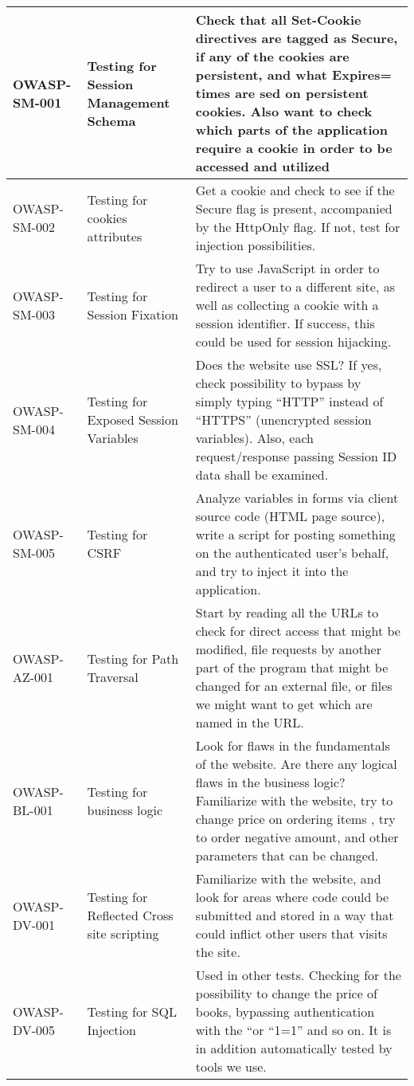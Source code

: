 \begin{longtable}{| l | p{4.5cm} | p{7.5cm} |}
	OWASP-SM-001 & Testing for Session Management Schema
&  
Check that all Set-Cookie directives are tagged as Secure, if any of the cookies are persistent, and what Expires= times are sed on persistent cookies. Also want to check which parts of the application require a cookie in order to be accessed and utilized
\\ \hline

	OWASP-SM-002 & Testing for cookies attributes
 & 
Get a cookie and check to see if the Secure flag is present, accompanied by the HttpOnly flag. If not, test for injection possibilities.
\\ \hline

	OWASP-SM-003 & Testing for Session Fixation
 &  
Try to use JavaScript in order to redirect a user to a different site, as well as collecting a cookie with a session identifier. If success, this could be used for session hijacking.
\\ \hline

	OWASP-SM-004 & Testing for Exposed Session Variables
 & 
Does the website use SSL? If yes, check possibility to bypass by simply typing “HTTP” instead of “HTTPS” (unencrypted session variables). Also, each request/response passing Session ID data shall be examined.
\\ \hline

	OWASP-SM-005 & Testing for CSRF
 &  
Analyze variables in forms via client source code (HTML page source), write a script for posting something on the authenticated user’s behalf, and try to inject it into the application.
\\ \hline

	OWASP-AZ-001 & Testing for Path Traversal
 &  
Start by reading all the URLs to check for direct access that might be modified, file requests by another part of the program that might be changed for an external file, or files we might want to get which are named in the URL.
\\ \hline

	OWASP-BL-001 & Testing for business logic
 & 
Look for flaws in the fundamentals of the website. Are there any logical flaws in the business logic? Familiarize with the website, try to change price on ordering items , try to order negative amount, and other parameters that can be changed.
\\ \hline

	OWASP-DV-001 & Testing for Reflected Cross site scripting &  

Familiarize with the website, and look for areas where code could be submitted and stored in a way that could inflict other users that visits the site.

\\ \hline 

	OWASP-DV-005 & Testing for SQL Injection
& 
Used in other tests. Checking for the possibility to change the price of books, bypassing authentication with the “or “1=1” and so on. It is in addition automatically tested by tools we use.\\ \hline

\end{longtable}






